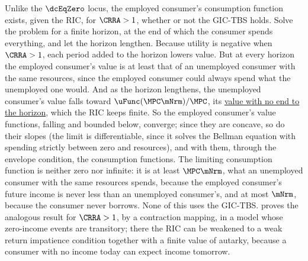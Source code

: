 \documentclass{econark}
\begin{document}
Unlike the $\dcEqZero$ locus, the employed consumer's consumption function exists, given the RIC, for $\CRRA > 1$, whether or not the GIC-TBS holds.  Solve the problem for a finite horizon, at the end of which the consumer spends everything, and let the horizon lengthen.  Because utility is negative when $\CRRA > 1$, each period added to the horizon lowers value.  But at every horizon the employed consumer's value is at least that of an unemployed consumer with the same resources, since the employed consumer could always spend what the unemployed one would.  And as the horizon lengthens, the unemployed consumer's value falls toward $\uFunc(\MPC\mNrm)/\MPC$, its \hyperref[sec:TractableBufferStock-ValueFunction]{value with no end to the horizon}, which the RIC keeps finite.  So the employed consumer's value functions, falling and bounded below, converge; since they are concave, so do their slopes (the limit is differentiable, since it solves the Bellman equation with spending strictly between zero and resources), and with them, through the envelope condition, the consumption functions.  The limiting consumption function is neither zero nor infinite: it is at least $\MPC\mNrm$, what an unemployed consumer with the same resources spends, because the employed consumer's future income is never less than an unemployed consumer's, and at most $\mNrm$, because the consumer never borrows.  None of this uses the GIC-TBS.  \citet{BufferStockTheory} proves the analogous result for $\CRRA > 1$, by a contraction mapping, in a model whose zero-income events are transitory; there the RIC can be weakened to a weak return impatience condition together with a finite value of autarky, because a consumer with no income today can expect income tomorrow.
\end{document}
